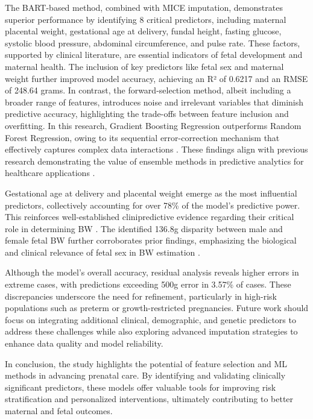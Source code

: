 \documentclass[12pt]{article}
\begin{document}
The BART-based method, combined with MICE imputation, demonstrates superior performance by identifying 8 critical predictors, including maternal placental weight, gestational age at delivery, fundal height, fasting glucose, systolic blood pressure, abdominal circumference, and pulse rate. These factors, supported by clinical literature, are essential indicators of fetal development and maternal health. The inclusion of key predictors like fetal sex and maternal weight further improved model accuracy, achieving an R² of 0.6217 and an RMSE of 248.64 grams. In contrast, the forward-selection method, albeit including a broader range of features, introduces noise and irrelevant variables that diminish predictive accuracy, highlighting the trade-offs between feature inclusion and overfitting.
In this research, Gradient Boosting Regression outperforms Random Forest Regression, owing to its sequential error-correction mechanism that effectively captures complex data interactions \cite{30A}. These findings align with previous research demonstrating the value of ensemble methods in predictive analytics for healthcare applications \cite{31A} \cite{32A}.

Gestational age at delivery and placental weight emerge as the most influential predictors, collectively accounting for over 78\% of the model’s predictive power. This reinforces well-established clinipredictive evidence regarding their critical role in determining BW \cite{31A} \cite{33A}. The identified 136.8g disparity between male and female fetal BW further corroborates prior findings, emphasizing the biological and clinical relevance of fetal sex in BW estimation \cite{32A}.

Although the model’s overall accuracy, residual analysis reveals higher errors in extreme cases, with predictions exceeding 500g error in 3.57\% of cases. These discrepancies underscore the need for refinement, particularly in high-risk populations such as preterm or growth-restricted pregnancies. Future work should focus on integrating additional clinical, demographic, and genetic predictors to address these challenges while also exploring advanced imputation strategies to enhance data quality and model reliability.

In conclusion, the study highlights the potential of feature selection and ML methods in advancing prenatal care. By identifying and validating clinically significant predictors, these models offer valuable tools for improving risk stratification and personalized interventions, ultimately contributing to better maternal and fetal outcomes.
\end{document}

